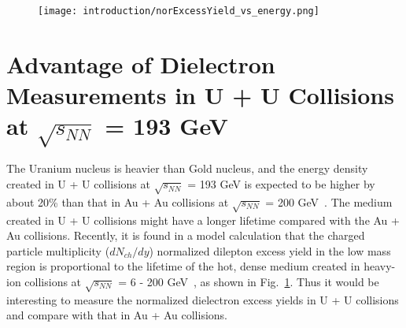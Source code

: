  \begin{figure}[htbp]
\centering
\texttt{[image: introduction/norExcessYield\_vs\_energy.png]}
 \label{lifetime}
\end{figure}

\section{Advantage of Dielectron Measurements in U + U Collisions at $\sqrt{s_{NN}}$ = 193 GeV}
 The Uranium nucleus is heavier than Gold nucleus, and the energy density created in U + U collisions at $\sqrt{s_{NN}}$ = 193 GeV is expected to be higher by about 20\% than that in Au + Au collisions at $\sqrt{s_{NN}}$ = 200 GeV~\cite{UUEnergyDensity}. The medium created in U + U collisions might have a longer lifetime compared with the Au + Au collisions. Recently, it is found in a model calculation that the charged particle multiplicity ($dN_{ch}/dy$) normalized dilepton excess yield in the low mass region is proportional to the lifetime of the hot, dense medium created in heavy-ion collisions at $\sqrt{s_{NN}}$ = 6 - 200 GeV~\cite{lifetime_cal}, as shown in Fig.~\ref{lifetime}. Thus it would be interesting to measure the normalized dielectron excess yields in U + U collisions and compare with that in Au + Au collisions.